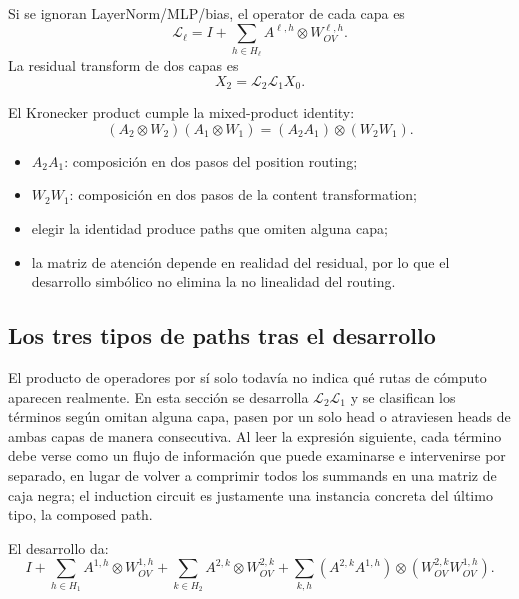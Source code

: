Si se ignoran LayerNorm/MLP/bias, el operator de cada capa es
\[
\mathcal{L}_{\ell}
=I+\sum_{h\in H_{\ell}}A^{\ell,h}\otimes W_{OV}^{\ell,h}.
\]
La residual transform de dos capas es
\[
X_2=\mathcal{L}_2\mathcal{L}_1X_0.
\]


El Kronecker product cumple la mixed-product identity:
\[
(A_2\otimes W_2)(A_1\otimes W_1)
=(A_2A_1)\otimes(W_2W_1).
\]

\begin{itemize}
  \item $A_2A_1$: composición en dos pasos del position routing;
  \item $W_2W_1$: composición en dos pasos de la content transformation;
  \item elegir la identidad produce paths que omiten alguna capa;
  \item la matriz de atención depende en realidad del residual, por lo que el desarrollo simbólico no elimina la no linealidad del routing.
\end{itemize}


\subsection{Los tres tipos de paths tras el desarrollo}

El producto de operadores por sí solo todavía no indica qué rutas de cómputo aparecen realmente. En esta sección se desarrolla $\mathcal{L}_2\mathcal{L}_1$ y se clasifican los términos según omitan alguna capa, pasen por un solo head o atraviesen heads de ambas capas de manera consecutiva. Al leer la expresión siguiente, cada término debe verse como un flujo de información que puede examinarse e intervenirse por separado, en lugar de volver a comprimir todos los summands en una matriz de caja negra; el induction circuit es justamente una instancia concreta del último tipo, la composed path.

El desarrollo da:
\[
I
+\sum_{h\in H_1}A^{1,h}\otimes W_{OV}^{1,h}
+\sum_{k\in H_2}A^{2,k}\otimes W_{OV}^{2,k}
+\sum_{k,h}(A^{2,k}A^{1,h})\otimes
(W_{OV}^{2,k}W_{OV}^{1,h}).
\]

